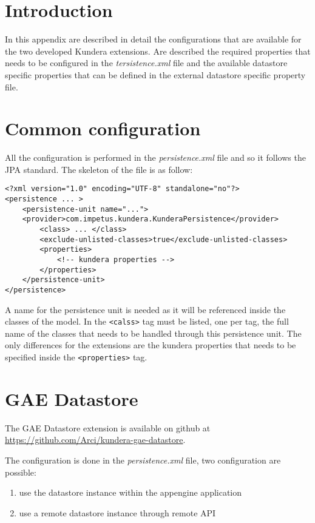 \section{Introduction}
In this appendix are described in detail the configurations that are available for the two developed Kundera extensions.
Are described the required properties that needs to be configured in the \textit{tersistence.xml} file and the available datastore specific properties that can be defined in the external datastore specific property file.

\section{Common configuration}
All the configuration is performed in the \textit{persistence.xml} file and so it follows the JPA standard.
The skeleton of the file is as follow:

\begin{verbatim}
<?xml version="1.0" encoding="UTF-8" standalone="no"?>
<persistence ... >
    <persistence-unit name="...">
    <provider>com.impetus.kundera.KunderaPersistence</provider>
        <class> ... </class>
        <exclude-unlisted-classes>true</exclude-unlisted-classes>
        <properties>
            <!-- kundera properties -->
        </properties>
    </persistence-unit>
</persistence>
\end{verbatim}

\noindent A name for the persistence unit is needed as it will be referenced inside the classes of the model.
In the \texttt{<calss>} tag must be listed, one per tag, the full name of the classes that needs to be handled through this persistence unit.
The only differences for the extensions are the kundera properties that needs to be specified inside the \texttt{<properties>} tag.

\section{GAE Datastore}
\label{appendix:datastore-config}
The GAE Datastore extension is available on github at \url{https://github.com/Arci/kundera-gae-datastore}.

\newparagraph The configuration is done in the \textit{persistence.xml} file, two configuration are possible:
\begin{enumerate}
\item use the datastore instance within the appengine application
\item use a remote datastore instance through remote API
\end{enumerate}

